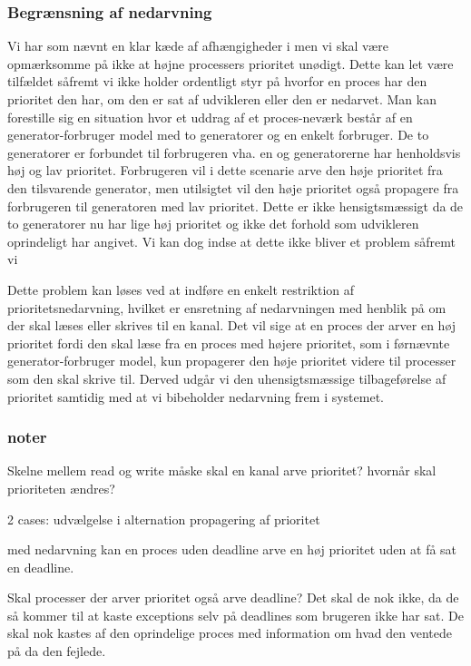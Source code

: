 \subsubsection*{Begrænsning af nedarvning}
Vi har som nævnt en klar kæde af afhængigheder i \pycsp men vi skal være opmærksomme på ikke at højne processers prioritet unødigt. Dette kan let være tilfældet såfremt vi ikke holder ordentligt styr på hvorfor en proces har den prioritet den har, om den er sat af udvikleren eller den er nedarvet. Man kan forestille sig en situation hvor et uddrag af et proces-neværk består af en generator-forbruger model med to generatorer og en enkelt forbruger. De to generatorer er forbundet til forbrugeren vha. en  og generatorerne har henholdsvis høj og lav prioritet. Forbrugeren vil i dette scenarie arve den høje prioritet fra den tilsvarende generator, men utilsigtet vil den høje prioritet også propagere fra forbrugeren til generatoren med lav prioritet. Dette er ikke hensigtsmæssigt da de to generatorer nu har lige høj prioritet og ikke det forhold som udvikleren oprindeligt har angivet. Vi kan dog indse at dette ikke bliver et problem såfremt vi 

Dette problem kan løses ved at indføre en enkelt restriktion af prioritetsnedarvning, hvilket er ensretning af nedarvningen med henblik på om der skal læses eller skrives til en kanal. Det vil sige at en proces der arver en høj prioritet fordi den skal læse fra en proces med højere prioritet, som i førnævnte generator-forbruger model, kun propagerer den høje prioritet videre til processer som den skal skrive til. Derved udgår vi den uhensigtsmæssige tilbageførelse af prioritet samtidig med at vi bibeholder nedarvning frem i systemet.

\subsubsection{noter}
Skelne mellem read og write
måske skal en kanal arve prioritet?
hvornår skal prioriteten ændres? 

2 cases:
udvælgelse i alternation
propagering af prioritet

med nedarvning kan en proces uden deadline arve en høj prioritet uden at få sat en deadline. 

Skal processer der arver prioritet også arve deadline? Det skal de nok ikke, da de så kommer til at kaste exceptions selv på deadlines som brugeren ikke har sat. De skal nok kastes af den oprindelige proces med information om hvad den ventede på da den fejlede. 


